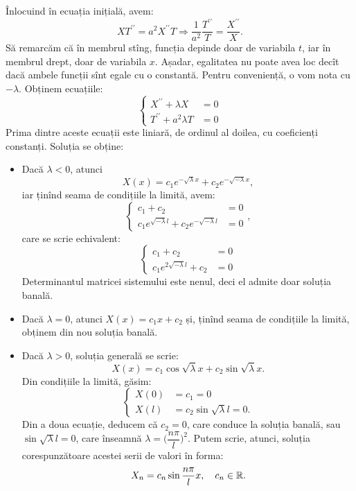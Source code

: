 Înlocuind în ecuația inițială, avem:
\[
  XT^{\prime\prime} = a^2X^{\prime\prime} T \Rightarrow %
  \dfrac{1}{a^2} \dfrac{T^{\prime\prime}}{T} = \dfrac{X^{\prime\prime}}{X}.
\]
Să remarcăm că în membrul stîng, funcția depinde doar de variabila $ t $, iar în
membrul drept, doar de variabila $ x $. Așadar, egalitatea nu poate avea loc
decît dacă ambele funcții sînt egale cu o constantă. Pentru conveniență, o vom nota
cu $ -\lambda $. Obținem ecuațiile:
\[
  \begin{cases}
    X^{\prime\prime} + \lambda X &= 0 \\
    T^{\prime\prime} + a^2\lambda T &= 0
  \end{cases}
\]
Prima dintre aceste ecuații este liniară, de ordinul al doilea, cu coeficienți
constanți. Soluția se obține:
\begin{itemize}
\item Dacă $ \lambda < 0 $, atunci
  \[
    X(x) = c_1 e^{-\sqrt{\lambda}x} + c_2 e^{-\sqrt{-\lambda} x},
  \]
  iar ținînd seama de condițiile la limită, avem:
  \[
    \begin{cases}
      c_1 + c_2 &= 0 \\
      c_1 e^{\sqrt{-\lambda} l} + c_2e^{-\sqrt{-\lambda} l} &= 0
    \end{cases},
  \]
  care se scrie echivalent:
  \[
    \begin{cases}
      c_1 + c_2 &= 0 \\
      c_1 e^{2\sqrt{-\lambda} l} + c_2 &= 0
    \end{cases}
  \]
  Determinantul matricei sistemului este nenul, deci el admite doar soluția banală.
\item Dacă $ \lambda = 0 $, atunci $ X(x) = c_1 x + c_2 $ și, ținînd seama de
  condițiile la limită, obținem din nou soluția banală.
\item Dacă $ \lambda > 0 $, soluția generală se scrie:
  \[
    X(x) = c_1 \cos \sqrt{\lambda} x + c_2 \sin \sqrt{\lambda} x.
  \]
  Din condițiile la limită, găsim:
  \[
    \begin{cases}
      X(0) &= c_1 = 0 \\
      X(l) &= c_2 \sin \sqrt{\lambda} l = 0.
    \end{cases}
  \]
  Din a doua ecuație, deducem că $ c_2 = 0 $, care conduce la soluția banală, sau
  $ \sin \sqrt{\lambda} l = 0 $, care înseamnă $ \lambda = \big(\dfrac{n\pi}{l}\big)^2 $.
  Putem scrie, atunci, soluția corespunzătoare acestei serii de valori în forma:
  \[
    X_n = c_n \sin \dfrac{n\pi}{l} x, \quad c_n \in \mathbb{R}.
  \]
\end{itemize}

